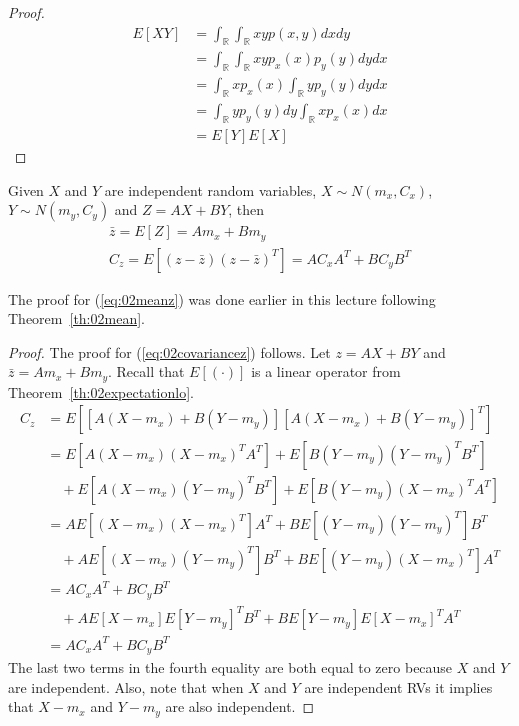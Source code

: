 \begin{proof}
\begin{align*}
E[XY] &= \int_\mathbb{R}\int_\mathbb{R} xyp(x,y)dxdy \\
&= \int_\mathbb{R}\int_\mathbb{R} xyp_x(x)p_y(y)dydx \\
&= \int_\mathbb{R} xp_x(x)\int_\mathbb{R} yp_y(y)dydx \\
&= \int_\mathbb{R} yp_y(y)dy \int_\mathbb{R} xp_x(x)dx \\
&= E[Y]E[X]
\end{align*}
\end{proof}

\begin{theorem}
\label{th:02covariance}
Given $X$ and $Y$ are independent random variables, $X\sim N(m_x,C_x)$, $Y\sim N(m_y,C_y)$ and $Z=AX+BY$, then
\begin{align}
\label{eq:02meanz}
\bar{z} = E[Z] = Am_x+Bm_y \\
\label{eq:02covariancez}
C_z = E[(z-\bar{z}){(z-\bar{z})}^T] = AC_x A^T + BC_y B^T
\end{align}
\end{theorem}

The proof for (\ref{eq:02meanz}) was done earlier in this lecture following Theorem~\ref{th:02mean}.

\begin{proof}
The proof for (\ref{eq:02covariancez}) follows.
Let $z=AX+BY$ and $\bar{z}=Am_x+Bm_y$.
Recall that $E[(\cdot)]$ is a linear operator from Theorem~\ref{th:02expectationlo}.
\begin{align*}
C_z &= E\left[[A(X-m_x)+B(Y-m_y)]{[A(X-m_x)+B(Y-m_y)]}^T\right] \\
    &= E[A(X-m_x){(X-m_x)}^T A^T] + E[B(Y-m_y){(Y-m_y)}^T B^T] \\
    &\quad + E[A(X-m_x){(Y-m_y)}^T B^T] + E[B(Y-m_y){(X-m_x)}^T A^T] \\
    &= AE[(X-m_x){(X-m_x)}^T]A^T + BE[(Y-m_y){(Y-m_y)}^T]B^T \\
    &\quad + AE[(X-m_x){(Y-m_y)}^T]B^T + BE[(Y-m_y){(X-m_x)}^T]A^T \\
    &= AC_x A^T + BC_y B^T \\
    &\quad + AE[X-m_x]E{[Y-m_y]}^T B^T + BE[Y-m_y]E{[X-m_x]}^T A^T \\
    &= AC_x A^T + BC_y B^T
\end{align*}
The last two terms in the fourth equality are both equal to zero because $X$ and $Y$ are independent.
Also, note that when $X$ and $Y$ are independent RVs it implies that $X-m_x$ and $Y-m_y$ are also independent.
\end{proof}

